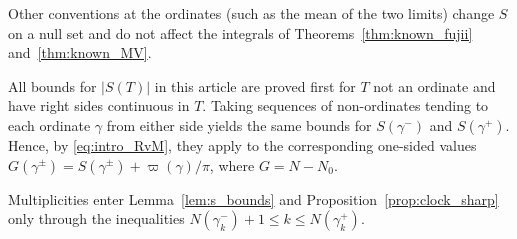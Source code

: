 \documentclass[11pt,a4paper]{article}
\makeatletter
\numberwithin{equation}{section}
\DeclareRobustCommand{\CGref}[1]{\ref{#1}}
\DeclareRobustCommand{\CGeqref}[1]{\eqref{#1}}
\let\CG@origref\ref
\let\CG@origeqref\eqref
\newcommand{\CG@gettip}[1]{\@ifundefined{CGTip@#1}{#1}{\csname CGTip@#1\endcsname}}
\DeclareRobustCommand{\CGref}[1]{\pdftooltip{\CG@origref{#1}}{\CG@gettip{#1}}}
\DeclareRobustCommand{\CGeqref}[1]{\pdftooltip{\CG@origeqref{#1}}{\CG@gettip{#1}}}
\theoremstyle{definition}
\theoremstyle{remark}
\newcommand{\Nz}{N_0} %
\makeatother
\begin{document}
Other conventions at the ordinates (such as the mean of the two limits) change $S$ on a null set and do not affect the integrals of Theorems~\CGref{thm:known_fujii} and~\CGref{thm:known_MV}.

All bounds for $|S(T)|$ in this article are proved first for $T$ not an ordinate and have right sides continuous in $T$. Taking sequences of non-ordinates tending to each ordinate $\gamma$ from either side yields the same bounds for $S(\gamma^-)$ and $S(\gamma^+)$. Hence, by \CGeqref{eq:intro_RvM}, they apply to the corresponding one-sided values $G(\gamma^\pm)=S(\gamma^\pm)+\varpi(\gamma)/\pi$, where $G=N-\Nz$.

Multiplicities enter Lemma~\CGref{lem:s_bounds} and Proposition~\CGref{prop:clock_sharp} only through the inequalities $N(\gamma_k^-)+1\le k\le N(\gamma_k^+)$.
\end{document}
